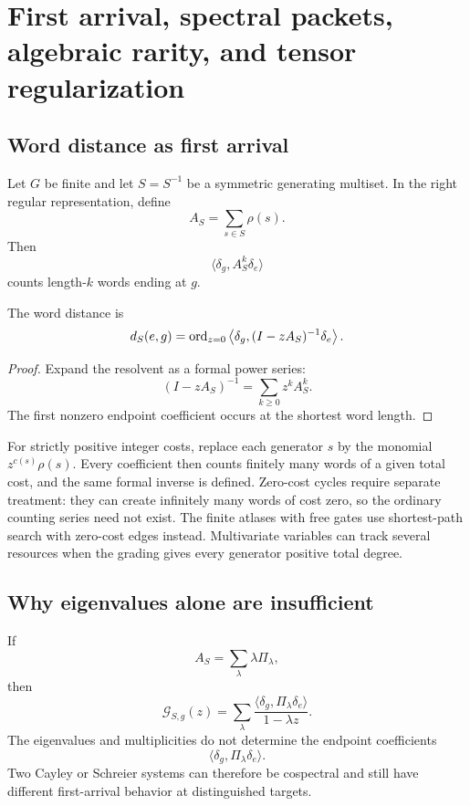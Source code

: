 \chapter{First arrival, spectral packets, algebraic rarity, and tensor regularization}\label{ch:spectral-algebraic}


\section{Word distance as first arrival}
Let $G$ be finite and let $S=S^{-1}$ be a symmetric generating multiset.  In the right regular representation, define
\[
A_S=\sum_{s\in S}\rho(s).
\]
Then
\[
\langle\delta_g,A_S^k\delta_e\rangle
\]
counts length-$k$ words ending at $g$.

\begin{theorem}
The word distance is
\[
d_S(e,g)
=
\operatorname{ord}_{z=0}
\left\langle
\delta_g,(I-zA_S)^{-1}\delta_e
\right\rangle.
\]
\end{theorem}
\begin{proof}
Expand the resolvent as a formal power series:
\[
(I-zA_S)^{-1}=\sum_{k\ge0}z^kA_S^k.
\]
The first nonzero endpoint coefficient occurs at the shortest word length.
\end{proof}

For strictly positive integer costs, replace each generator $s$ by the monomial $z^{c(s)}\rho(s)$.  Every coefficient then counts finitely many words of a given total cost, and the same formal inverse is defined.  Zero-cost cycles require separate treatment: they can create infinitely many words of cost zero, so the ordinary counting series need not exist.  The finite atlases with free gates use shortest-path search with zero-cost edges instead.  Multivariate variables can track several resources when the grading gives every generator positive total degree.

\section{Why eigenvalues alone are insufficient}
If
\[
A_S=\sum_\lambda\lambda\Pi_\lambda,
\]
then
\[
\mathcal G_{S,g}(z)
=
\sum_\lambda
\frac{\langle\delta_g,\Pi_\lambda\delta_e\rangle}{1-\lambda z}.
\]
The eigenvalues and multiplicities do not determine the endpoint coefficients
\[
\langle\delta_g,\Pi_\lambda\delta_e\rangle.
\]
Two Cayley or Schreier systems can therefore be cospectral and still have different first-arrival behavior at distinguished targets.

